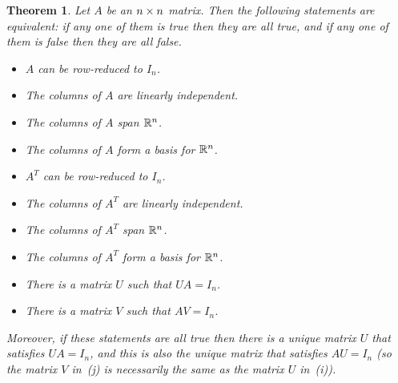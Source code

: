 \documentclass[reqno]{amsart}
\newtheorem{theorem}{Theorem}[section]
\theoremstyle{definition}
\begin{document}
\begin{theorem}\label{thm-inverse}
 Let $A$ be an $n\times n$ matrix.  Then the following statements are
 equivalent: if any one of them is true then they are all true, and if
 any one of them is false then they are all false.
 \begin{itemize}
  \item[(a)] $A$ can be row-reduced to $I_n$.
  \item[(b)] The columns of $A$ are linearly independent.
  \item[(c)] The columns of $A$ span ${\mathbb{R}}^n$.
  \item[(d)] The columns of $A$ form a basis for ${\mathbb{R}}^n$.
  \item[(e)] $A^T$ can be row-reduced to $I_n$.
  \item[(f)] The columns of $A^T$ are linearly independent.
  \item[(g)] The columns of $A^T$ span ${\mathbb{R}}^n$.
  \item[(h)] The columns of $A^T$ form a basis for ${\mathbb{R}}^n$.
  \item[(i)] There is a matrix $U$ such that $UA=I_n$.
  \item[(j)] There is a matrix $V$ such that $AV=I_n$.
 \end{itemize}
 Moreover, if these statements are all true then there is a unique
 matrix $U$ that satisfies $UA=I_n$, and this is also the unique
 matrix that satisfies $AU=I_n$ (so the matrix $V$ in~(j) is
 necessarily the same as the matrix $U$ in~(i)).
\end{theorem}
\end{document}
